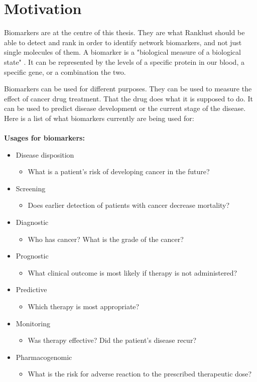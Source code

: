 \documentclass[UKenglish,11pt,a4paper]{article}
\begin{document}
\chapter{Motivation}
Biomarkers are at the centre of this thesis. They are what Ranklust should be able to detect and rank in order to
identify network biomarkers, and not just single molecules of them. A biomarker is a "biological measure of a biological
state" \cite{biomarker1}. It can be represented by the levels of a specific protein in our blood, a specific gene, or a
combination the two.

Biomarkers can be used for different purposes. They can be used to measure the effect of cancer drug treatment. That the
drug does what it is supposed to do. It can be used to predict disease development or the current stage of the
disease. Here is a list of what biomarkers currently are being used for:
\\\\
\textbf{Usages for biomarkers:} \cite{beyondpsa}
\begin{itemize}
    \item Disease disposition
        \begin{itemize}
            \item What is a patient's risk of developing cancer in the future?
        \end{itemize}
    \item Screening
        \begin{itemize}
            \item Does earlier detection of patients with cancer decrease mortality?
        \end{itemize}
    \item Diagnostic
        \begin{itemize}
            \item Who has cancer? What is the grade of the cancer?
        \end{itemize}
    \item Prognostic
        \begin{itemize}
            \item What clinical outcome is most likely if therapy is not administered?
        \end{itemize}
    \item Predictive
        \begin{itemize}
            \item Which therapy is most appropriate?
        \end{itemize}
    \item Monitoring
        \begin{itemize}
            \item Was therapy effective? Did the patient's disease recur?
        \end{itemize}
    \item Pharmacogenomic
        \begin{itemize}
            \item What is the risk for adverse reaction to the prescribed therapeutic dose?
        \end{itemize}
\end{itemize}
\end{document}
